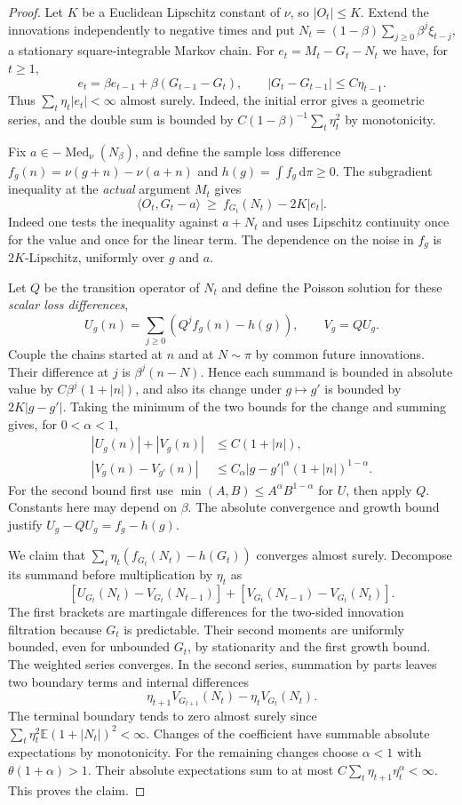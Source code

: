 \documentclass[10pt,letterpaper]{article}
\newcommand{\E}{\mathbb E}
\newcommand{\ip}[2]{\langle #1,#2\rangle}
\newcommand{\Med}{\operatorname{Med}}
\newcommand{\dd}{\,\mathrm d}
\begin{document}
\begin{proof}
Let $K$ be a Euclidean Lipschitz constant of $\nu$, so $|O_t|\le K$. Extend the innovations independently to negative times and put $N_t=(1-\beta)\sum_{j\ge0}\beta^j\xi_{t-j}$, a stationary square-integrable Markov chain. For $e_t=M_t-G_t-N_t$ we have, for $t\ge1$,
\[
 e_t=\beta e_{t-1}+\beta(G_{t-1}-G_t),\qquad |G_t-G_{t-1}|\le C\eta_{t-1}.
\]
Thus $\sum_t\eta_t|e_t|<\infty$ almost surely. Indeed, the initial error gives a geometric series, and the double sum is bounded by $C(1-\beta)^{-1}\sum_t\eta_t^2$ by monotonicity.

Fix $a\in-\Med_\nu(N_\beta)$, and define the sample loss difference $f_g(n)=\nu(g+n)-\nu(a+n)$ and $h(g)=\int f_g\dd\pi\ge0$. The subgradient inequality at the \emph{actual} argument $M_t$ gives
\begin{equation}
 \ip{O_t}{G_t-a}\ \ge\ f_{G_t}(N_t)-2K|e_t|.
 \label{eq:path}
\end{equation}
Indeed one tests the inequality against $a+N_t$ and uses Lipschitz continuity once for the value and once for the linear term. The dependence on the noise in $f_g$ is $2K$-Lipschitz, uniformly over $g$ and $a$.

Let $Q$ be the transition operator of $N_t$ and define the Poisson solution for these \emph{scalar loss differences},
\[
 U_g(n)=\sum_{j\ge0}(Q^jf_g(n)-h(g)),\qquad V_g=QU_g.
\]
Couple the chains started at $n$ and at $N\sim\pi$ by common future innovations. Their difference at $j$ is $\beta^j(n-N)$. Hence each summand is bounded in absolute value by $C\beta^j(1+|n|)$, and also its change under $g\mapsto g'$ is bounded by $2K|g-g'|$. Taking the minimum of the two bounds for the change and summing gives, for $0<\alpha<1$,
\begin{align*}
 |U_g(n)|+|V_g(n)|&\le C(1+|n|),\\
 |V_g(n)-V_{g'}(n)|&\le C_\alpha |g-g'|^\alpha(1+|n|)^{1-\alpha}.
\end{align*}
For the second bound first use $\min(A,B)\le A^\alpha B^{1-\alpha}$ for $U$, then apply $Q$. Constants here may depend on $\beta$. The absolute convergence and growth bound justify $U_g-QU_g=f_g-h(g)$.

We claim that $\sum_t\eta_t(f_{G_t}(N_t)-h(G_t))$ converges almost surely. Decompose its summand before multiplication by $\eta_t$ as
\[
 [U_{G_t}(N_t)-V_{G_t}(N_{t-1})]
 +[V_{G_t}(N_{t-1})-V_{G_t}(N_t)].
\]
The first brackets are martingale differences for the two-sided innovation filtration because $G_t$ is predictable. Their second moments are uniformly bounded, even for unbounded $G_t$, by stationarity and the first growth bound. The weighted series converges. In the second series, summation by parts leaves two boundary terms and internal differences
\[
 \eta_{t+1}V_{G_{t+1}}(N_t)-\eta_t V_{G_t}(N_t).
\]
The terminal boundary tends to zero almost surely since $\sum_t\eta_t^2\E(1+|N_t|)^2<\infty$. Changes of the coefficient have summable absolute expectations by monotonicity. For the remaining changes choose $\alpha<1$ with $\theta(1+\alpha)>1$. Their absolute expectations sum to at most $C\sum_t\eta_{t+1}\eta_t^\alpha<\infty$. This proves the claim.


\end{proof}
\end{document}
